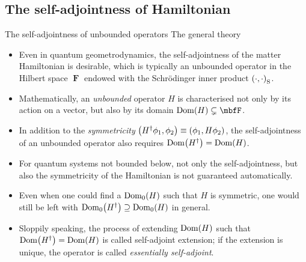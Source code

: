 \documentclass[8pt]{beamer}
\begin{document}
\subsection{The self-adjointness of Hamiltonian}

\begin{frame}%
{The self-adjointness of unbounded operators}%
{The general theory}
\begin{itemize}
\item Even in quantum geometrodynamics, the self-adjointness of the matter
Hamiltonian is desirable,
which is typically an unbounded operator in the Hilbert space $\mbfF$ endowed
with the Schr\"odinger inner product ${\left(\cdot,\cdot\right)}_\text{S}$.

\item Mathematically, an \emph{unbounded} operator
$H$ is characterised not only by its action on a vector, but also by its domain
$\rfun{\mathrm{Dom}}{H} \subsetneq \mbfF$.

\item In addition to the \emph{symmetricity} ${\left(H^\dagger \phi_1, \phi_2\right)}
\equiv {\left(\phi_1, H \phi_2\right)}$, the self-adjointness of an unbounded operator
also requires ${\mathrm{Dom}}\mathopen{}\left(H^\dagger\right)\mathclose{} = {\mathrm{Dom}}\mathopen{}\left(H\right)\mathclose{}$.

\item For quantum systems not bounded below, not only the self-adjointness, but
also the symmetricity of the Hamiltonian is not guaranteed automatically.

\item Even when one could find a ${\mathrm{Dom}_0}\mathopen{}\left(H\right)\mathclose{}$ such that $H$ is
symmetric, one would still be left with ${\mathrm{Dom}_0}\mathopen{}\left(H^\dagger\right)\mathclose{}
\supseteq {\mathrm{Dom}_0}\mathopen{}\left(H\right)\mathclose{}$ in general.

\item Sloppily speaking, the process of extending ${\mathrm{Dom}}\mathopen{}\left(H\right)\mathclose{}$ such
that ${\mathrm{Dom}}\mathopen{}\left(H^\dagger\right)\mathclose{} = {\mathrm{Dom}}\mathopen{}\left(H\right)\mathclose{}$ is called
\alert{self-adjoint extension}; if the extension is unique, the operator is called
\emph{essentially self-adjoint}.

\end{itemize}
\end{frame}
\end{document}
